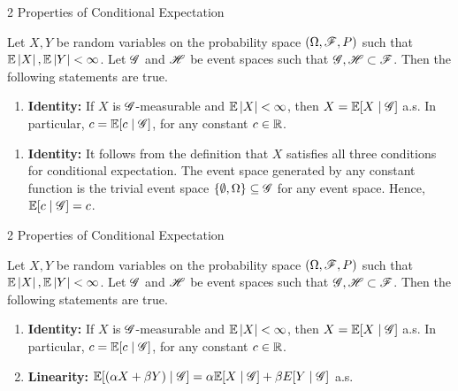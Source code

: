 \documentclass[12pt,aspectratio=169]{beamer}
\begin{document}
\begin{frame}{2 Properties of Conditional Expectation}
\begin{prop} 
Let $X,Y$ be random variables on the probability space $(\Omega, \mathscr{F}, P)$ such that $\mathbb{E}\left\lvert X\right\rvert , \mathbb{E}\left\lvert Y\right\rvert < \infty$. 
Let $\mathscr{G}$ and $\mathscr{H}$ be event spaces such that $\mathscr{G}, \mathscr{H} \subset \mathscr{F}$. 
Then the following statements are true. 
\begin{enumerate}
\item <2-> \textbf{Identity:} If $X$ is $\mathscr{G}$-measurable and $\mathbb{E}\left\lvert X\right\rvert < \infty$, then $X = \mathbb{E}[X\mid\mathscr{G}]$ a.s. 
In particular, $c = \mathbb{E}[c\mid \mathscr{G}]$, for any constant $c \in  \mathbb{R}$. 
\end{enumerate}
\end{prop}
\end{frame}


\begin{frame}
\begin{Proof}
\begin{enumerate}
\item <1-> \textbf{Identity:} It follows from the definition that $X$ satisfies all three conditions for conditional expectation.  
The event space generated by any constant function is the trivial event space $\left\{\emptyset, \Omega\right\} \subseteq \mathscr{G}$ for any event space. 
Hence, $\mathbb{E}[c\mid \mathscr{G}] = c$. 
\end{enumerate}
\end{Proof}
\end{frame}

\begin{frame}{2 Properties of Conditional Expectation}
\begin{prop} 
Let $X,Y$ be random variables on the probability space $(\Omega, \mathscr{F}, P)$ such that $\mathbb{E}\left\lvert X\right\rvert , \mathbb{E}\left\lvert Y\right\rvert < \infty$. 
Let $\mathscr{G}$ and $\mathscr{H}$ be event spaces such that $\mathscr{G}, \mathscr{H} \subset \mathscr{F}$. 
Then the following statements are true. 
\begin{enumerate}
\item \textbf{Identity:} If $X$ is $\mathscr{G}$-measurable and $\mathbb{E}\left\lvert X\right\rvert < \infty$, then $X = \mathbb{E}[X\mid\mathscr{G}]$ a.s. 
In particular, $c = \mathbb{E}[c\mid \mathscr{G}]$, for any constant $c \in  \mathbb{R}$. 
\item \textbf{Linearity:} $\mathbb{E}[(\alpha X + \beta Y) \mid \mathscr{G}] = \alpha \mathbb{E}[X\mid\mathscr{G}] + \beta E[Y\mid \mathscr{G}]$ a.s. 
\end{enumerate}
\end{prop}
\end{frame}
\end{document}
